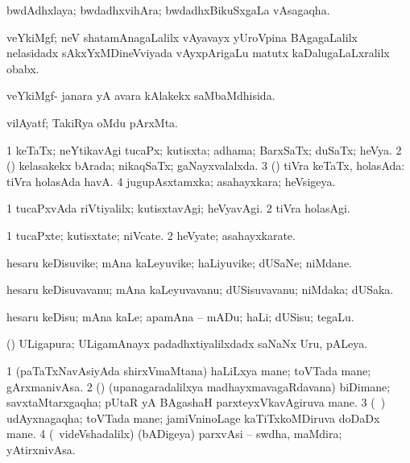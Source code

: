 \bentry
{} 
\gl{\nA}
\expl{}
\bmng
 bwdAdhxlaya; bwdadhxvihAra; bwdadhxBikuSxgaLa vAsagaqha. 
\emng
\eentry

\bentry
{} 
\gl{\nA}
\expl{}
\bmng
 veYkiMgf; neV shatamAnagaLalilx vAyavayx yUroVpina BAgagaLalilx nelasidadx sAkxYxMDineVviyada vAyxpArigaLu matutx kaDalugaLaLxralilx obabx. 
\emng
\eentry

\bentry
{} 
\gl{\gu}
\expl{}
\bmng
 veYkiMgf- janara yA avara kAlakekx saMbaMdhisida. 
\emng
\eentry

\bentry
{} 
\gl{\nA}
\expl{}
\bmng
 vilAyatf; TakiRya oMdu pArxMta. 
\emng
\eentry

\bentry
{} 
\gl{\gu}
\expl{}
\bmng
\bnum
\num{1} keTaTx; neYtikavAgi tucaPx; kutisxta; adhama; BarxSaTx; duSaTx; heVya. 
\num{2} (\pArxparx) kelasakekx bArada; nikaqSaTx; gaNayxvalalxda. 
\num{3} (\AmA) tiVra keTaTx, holasAda:  tiVra holasAda havA. 
\num{4} jugupAsxtamxka; asahayxkara; heVsigeya. 
\enum
\emng
\eentry

\bentry
{} 
\gl{\kirxvi}
\expl{}
\bmng
\bnum
\num{1} tucaPxvAda riVtiyalilx; kutisxtavAgi; heVyavAgi. 
\num{2} tiVra holasAgi. 
\enum
\emng
\eentry

\bentry
{} 
\gl{\nA}
\expl{}
\bmng
\bnum
\num{1} tucaPxte; kutisxtate; niVcate. 
\num{2} heVyate; asahayxkarate. 
\enum
\emng
\eentry

\bentry
{} 
\gl{\nA}
\expl{}
\bmng
 hesaru keDisuvike; mAna kaLeyuvike; haLiyuvike; dUSaNe; niMdane. 
\emng
\eentry

\bentry
{} 
\gl{\nA}
\expl{}
\bmng
 hesaru keDisuvavanu; mAna kaLeyuvavanu; dUSisuvavanu; niMdaka; dUSaka. 
\emng
\eentry

\bentry
{} 
\gl{\sakirx}
\bmng
 hesaru keDisu; mAna kaLe; apamAna -- mADu; haLi; dUSisu; tegaLu. 
\emng
\eentry

\bentry
{} 
\gl{\nA}
\expl{}
\bmng
 (\ca) ULigapura; ULigamAnayx padadhxtiyalilxdadx saNaNx Uru, pALeya. 
\emng
\eentry

\bentry
{} 
\gl{\nA}
\expl{}
\bmng
\bnum
\num{1} (paTaTxNavAsiyAda shirxVmaMtana) haLiLxya mane; toVTada mane; gArxmanivAsa. 
\num{2} (\birx) (upanagaradalilxya madhayxmavagaRdavana) biDimane; savxtaMtarxgaqha; pUtaR yA BAgashaH parxteyxVkavAgiruva mane. 
\num{3} (\roV\ \pArxkatx) udAyxnagaqha; toVTada mane; jamiVninoLage kaTiTxkoMDiruva doDaDx mane. 
\num{4} (\kanmu\ videVshadalilx) (bADigeya) parxvAsi -- swdha, maMdira; yAtirxnivAsa. 
\enum
\emng
\eentry

